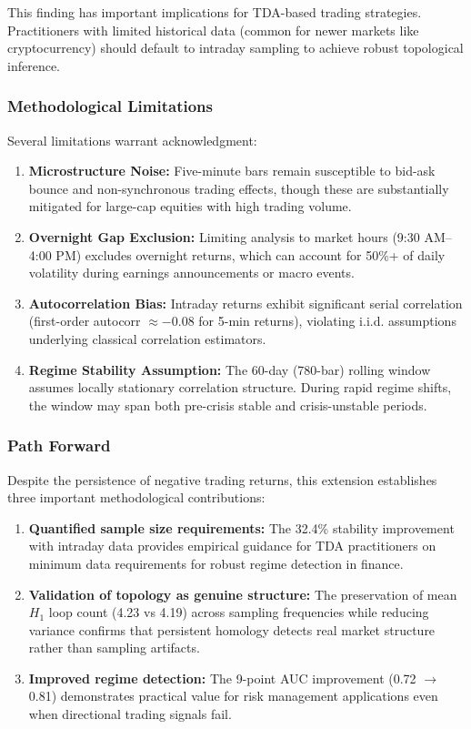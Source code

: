 This finding has important implications for TDA-based trading strategies. Practitioners with limited historical data (common for newer markets like cryptocurrency) should default to intraday sampling to achieve robust topological inference.

\subsubsection{Methodological Limitations}

Several limitations warrant acknowledgment:

\begin{enumerate}
\item \textbf{Microstructure Noise:} Five-minute bars remain susceptible to bid-ask bounce and non-synchronous trading effects, though these are substantially mitigated for large-cap equities with high trading volume.

\item \textbf{Overnight Gap Exclusion:} Limiting analysis to market hours (9:30 AM--4:00 PM) excludes overnight returns, which can account for 50\%+ of daily volatility during earnings announcements or macro events.

\item \textbf{Autocorrelation Bias:} Intraday returns exhibit significant serial correlation (first-order autocorr $\approx -0.08$ for 5-min returns), violating i.i.d. assumptions underlying classical correlation estimators.

\item \textbf{Regime Stability Assumption:} The 60-day (780-bar) rolling window assumes locally stationary correlation structure. During rapid regime shifts, the window may span both pre-crisis stable and crisis-unstable periods.
\end{enumerate}

\subsubsection{Path Forward}

Despite the persistence of negative trading returns, this extension establishes three important methodological contributions:

\begin{enumerate}
\item \textbf{Quantified sample size requirements:} The 32.4\% stability improvement with intraday data provides empirical guidance for TDA practitioners on minimum data requirements for robust regime detection in finance.

\item \textbf{Validation of topology as genuine structure:} The preservation of mean $H_1$ loop count (4.23 vs 4.19) across sampling frequencies while reducing variance confirms that persistent homology detects real market structure rather than sampling artifacts.

\item \textbf{Improved regime detection:} The 9-point AUC improvement (0.72 $\to$ 0.81) demonstrates practical value for risk management applications even when directional trading signals fail.
\end{enumerate}

